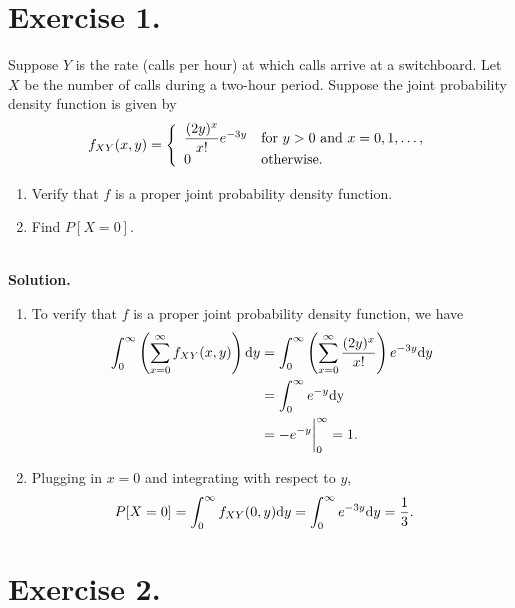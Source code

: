\section*{Exercise 1.}

Suppose $Y$ is the rate (calls per hour) at which calls arrive at a switchboard. Let $X$ be the number of calls during a two-hour period. Suppose the joint probability density function is given by
\begin{align*}
f_{XY}(x, y) = \left\{
\begin{array}{ll}
\dfrac{(2y)^x}{x!} e^{-3y} & \mathrm{for\ } y > 0 \mathrm{\ and\ } x = 0, 1, \ldots, \\
0 & \mathrm{otherwise}.
\end{array}
\right.
\end{align*}
\begin{enumerate}
	\item Verify that $f$ is a proper joint probability density function.
	\item Find $P[X = 0]$.
\end{enumerate}
~\\
\textbf{Solution.} 
\begin{enumerate}
	\item To verify that $f$ is a proper joint probability density function, we have
	\begin{align*}
	\int_0^{\infty}\left(\sum_{x=0}^{\infty} f_{XY}(x, y)\right) \mathrm{d}y & = \int_0^{\infty} \left(\sum_{x=0}^{\infty} \frac{(2y)^x}{x!} \right) e^{-3y} \mathrm{d}y \\
	& = \int_0^{\infty} e^{-y} \mathrm{dy} \\
	& = -e^{-y} \bigg|_0^{\infty} = 1.
	\end{align*}
	\item Plugging in $x = 0$ and integrating with respect to $y$,
	\begin{align*}
	P[X = 0] & = \int_0^{\infty} f_{XY}(0, y)\mathrm{d}y = \int_0^{\infty} e^{-3y} \mathrm{d}y = \frac{1}{3}.
	\end{align*}
\end{enumerate}


\section*{Exercise 2.}


